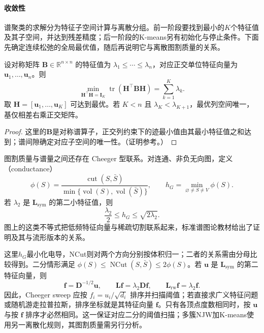 \paragraph{收敛性}
谱聚类的求解分为特征子空间计算与离散分组。前一阶段要找到最小的$K$个特征值及其子空间，并达到残差精度；后一阶段的K-means另有初始化与停止条件。下面先确定连续松弛的全局最优值，随后再说明它与离散图割质量的关系。

\begin{theorem}
 \label{thm:clustering-rayleigh}
 设对称矩阵 $\bm{B}\in\mathbb{R}^{n\times n}$ 的特征值为 $\lambda_1\leq\cdots\leq\lambda_n$，对应正交单位特征向量为 $\bm{u}_1,\ldots,\bm{u}_n$。则
 \[
 \min_{\bm{H}^{\top}\bm{H}=\bm{I}_K}
 \operatorname{tr}(\bm{H}^{\top}\bm{B}\bm{H})
 =\sum_{k=1}^K\lambda_k.
 \]
 取 $\bm{H}=[\bm{u}_1,\ldots,\bm{u}_K]$ 可达到最优。若 $K<n$ 且 $\lambda_K<\lambda_{K+1}$，最优列空间唯一，基仅相差右乘正交矩阵。
\end{theorem}
\begin{proof}
这里的$\bm B$是对称谱算子，正交列约束下的迹最小值由其最小特征值之和达到；谱间隙确定对应子空间的唯一性。（证明参考。）
\end{proof}

图割质量与谱量之间还存在 Cheeger 型联系。对连通、非负无向图，定义（conductance）
\[
 \phi(S)=
 \frac{\operatorname{cut}(S,\bar S)}
 {\min\{\operatorname{vol}(S),\operatorname{vol}(\bar S)\}},
 \qquad h_G=\min_{\varnothing\ne S\ne V}\phi(S).
\]
若 $\lambda_2$ 是 $\bm{L}_{\mathrm{sym}}$ 的第二小特征值，则
\begin{equation}
 \frac{\lambda_2}{2}\leq h_G\leq\sqrt{2\lambda_2}.
 \label{eq:clustering-cheeger}
\end{equation}
图上的这类不等式把低频特征向量与稀疏切割联系起来，标准谱图论教材给出了证明及其与流形版本的关系。

这里$h_G$最小化电导，NCut则对两个方向分别按体积归一；二者的关系需由分母比较得到。二分情形满足 $\phi(S)\leq\operatorname{NCut}(S,\bar S)\leq2\phi(S)$。若 $\bm{u}$ 是 $\bm{L}_{\mathrm{sym}}$ 的第二特征向量，则
\[
 \bm{f}=\bm{D}^{-1/2}\bm{u},
 \qquad
 \bm{L}\bm{f}=\lambda_2\bm{D}\bm{f},
 \qquad
 \bm{L}_{\mathrm{rw}}\bm{f}=\lambda_2\bm{f}.
\]
因此，Cheeger sweep 应按 $f_i=u_i/\sqrt{d_i}$ 排序并扫描阈值；若直接求广义特征问题或随机游走拉普拉斯，排序坐标就是其特征向量 $\bm{f}$。只有各顶点度数相同时，按 $\bm{u}$ 与按 $\bm{f}$ 排序才必然相同。这一保证对应二分的阈值扫描；多簇NJW加K-means使用另一离散化规则，其图割质量需另行分析。

